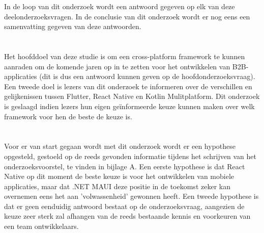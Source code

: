 In de loop van dit onderzoek wordt een antwoord gegeven op elk van deze deelonderzoeksvragen. In de conclusie van dit onderzoek wordt er nog eens een samenvatting gegeven van deze antwoorden.

\section{}
\label{sec:onderzoeksdoelstelling}


Het hoofddoel van deze studie is om een cross-platform framework te kunnen aanraden om de komende jaren op in te zetten voor het ontwikkelen van B2B-applicaties (dit is dus een antwoord kunnen geven op de hoofdonderzoeksvraag). Een tweede doel is lezers van dit onderzoek te informeren over de verschillen en gelijkenissen tussen Flutter, React Native en Kotlin Mulitplatform. Dit onderzoek is geslaagd indien lezers hun eigen geïnformeerde keuze kunnen maken over welk framework voor hen de beste de keuze is.

\section{}
\label{sec:hypothese}

Voor er van start gegaan wordt met dit onderzoek wordt er een hypothese opgesteld, gestoeld op de reeds gevonden informatie tijdens het schrijven van het onderzoeksvoorstel, te vinden in bijlage A. Een eerste hypothese is dat React Native op dit moment de beste keuze is voor het ontwikkelen van mobiele applicaties, maar dat .NET MAUI deze positie in de toekomst zeker kan overnemen eens het aan 'volwassenheid' gewonnen heeft. Een tweede hypothese is dat er geen eenduidig antwoord bestaat op de onderzoeksvraag, aangezien de keuze zeer sterk zal afhangen van de reeds bestaande kennis en voorkeuren van een team ontwikkelaars.

\section{}
\label{sec:opzet-bachelorproef}


